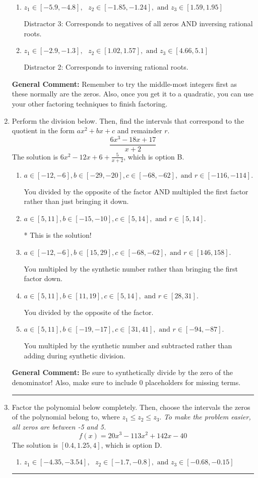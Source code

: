 \documentclass{extbook}[14pt]
\newcommand{\litem}[1]{\item #1

\rule{\textwidth}{0.4pt}}
\begin{document}
\begin{enumerate}
{\begin{enumerate}[label=\Alph*.]
 Distractor 1: Corresponds to negatives of all zeros.
\item \( z_1 \in [-5.9, -4.8], \text{   }  z_2 \in [-1.85, -1.24], \text{   and   } z_3 \in [1.59, 1.95] \)

 Distractor 3: Corresponds to negatives of all zeros AND inversing rational roots.
\item \( z_1 \in [-2.9, -1.3], \text{   }  z_2 \in [1.02, 1.57], \text{   and   } z_3 \in [4.66, 5.1] \)

 Distractor 2: Corresponds to inversing rational roots.
\end{enumerate}

\textbf{General Comment:} Remember to try the middle-most integers first as these normally are the zeros. Also, once you get it to a quadratic, you can use your other factoring techniques to finish factoring.
}
\litem{
Perform the division below. Then, find the intervals that correspond to the quotient in the form $ax^2+bx+c$ and remainder $r$.
\[ \frac{6x^{3} -18 x + 17}{x + 2} \]The solution is \( 6x^{2} -12 x + 6 + \frac{5}{x + 2} \), which is option B.\begin{enumerate}[label=\Alph*.]
\item \( a \in [-12, -6], b \in [-29, -20], c \in [-68, -62], \text{ and } r \in [-116, -114]. \)

 You divided by the opposite of the factor AND multipled the first factor rather than just bringing it down.
\item \( a \in [5, 11], b \in [-15, -10], c \in [5, 14], \text{ and } r \in [5, 14]. \)

* This is the solution!
\item \( a \in [-12, -6], b \in [15, 29], c \in [-68, -62], \text{ and } r \in [146, 158]. \)

 You multipled by the synthetic number rather than bringing the first factor down.
\item \( a \in [5, 11], b \in [11, 19], c \in [5, 14], \text{ and } r \in [28, 31]. \)

 You divided by the opposite of the factor.
\item \( a \in [5, 11], b \in [-19, -17], c \in [31, 41], \text{ and } r \in [-94, -87]. \)

 You multipled by the synthetic number and subtracted rather than adding during synthetic division.
\end{enumerate}

\textbf{General Comment:} Be sure to synthetically divide by the zero of the denominator! Also, make sure to include 0 placeholders for missing terms.
}
\litem{
Factor the polynomial below completely. Then, choose the intervals the zeros of the polynomial belong to, where $z_1 \leq z_2 \leq z_3$. \textit{To make the problem easier, all zeros are between -5 and 5.}
\[ f(x) = 20x^{3} -113 x^{2} +142 x -40 \]The solution is \( [0.4, 1.25, 4] \), which is option D.\begin{enumerate}[label=\Alph*.]
\item \( z_1 \in [-4.35, -3.54], \text{   }  z_2 \in [-1.7, -0.8], \text{   and   } z_3 \in [-0.68, -0.15] \)


\end{enumerate}}
\end{enumerate}
\end{document}
